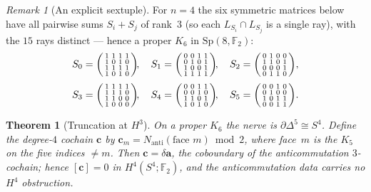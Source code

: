\documentclass[11pt,a4paper]{article}
\newcommand{\Nanti}{N_{\mathrm{anti}}}
\newcommand{\Sp}{\mathrm{Sp}}
\newcommand{\F}{\mathbb{F}}
\theoremstyle{plain}
\newtheorem{theorem}{Theorem}[section]
\theoremstyle{definition}
\theoremstyle{remark}
\newtheorem*{remark}{Remark}
\begin{document}
\begin{remark}[An explicit sextuple]
For $n=4$ the six symmetric matrices below have all pairwise sums $S_i+S_j$ of
rank~$3$ (so each $L_{S_i}\cap L_{S_j}$ is a single ray), with the $15$ rays
distinct --- hence a proper $K_6$ in $\Sp(8,\F_2)$:
\[
S_0=\begin{psmallmatrix}1&1&1&1\\1&0&1&0\\1&1&1&1\\1&0&1&0\end{psmallmatrix}\!,\quad
S_1=\begin{psmallmatrix}0&0&1&1\\0&1&0&1\\1&0&0&1\\1&1&1&1\end{psmallmatrix}\!,\quad
S_2=\begin{psmallmatrix}0&1&0&0\\1&1&0&1\\0&0&0&1\\0&1&1&0\end{psmallmatrix},
\]
\[
S_3=\begin{psmallmatrix}1&1&1&1\\1&1&1&0\\1&1&0&0\\1&0&0&0\end{psmallmatrix}\!,\quad
S_4=\begin{psmallmatrix}0&0&1&1\\0&0&1&0\\1&1&0&1\\1&0&1&0\end{psmallmatrix}\!,\quad
S_5=\begin{psmallmatrix}0&0&1&0\\0&1&0&0\\1&0&1&1\\0&0&1&1\end{psmallmatrix}.
\]
\end{remark}

\begin{theorem}[Truncation at \texorpdfstring{$H^3$}{H3}]\label{thm:trunc}
On a proper $K_6$ the nerve is $\partial\Delta^5\cong S^4$.  Define the degree-$4$
cochain $\mathbf c$ by $\mathbf c_m=\Nanti(\text{face }m)\bmod2$, where face~$m$ is
the $K_5$ on the five indices $\ne m$.  Then $\mathbf c=\delta\mathbf a$, the
coboundary of the anticommutation $3$-cochain; hence $[\mathbf c]=0$ in
$H^4(S^4;\F_2)$, and the anticommutation data carries no $H^4$ obstruction.
\end{theorem}
\end{document}
